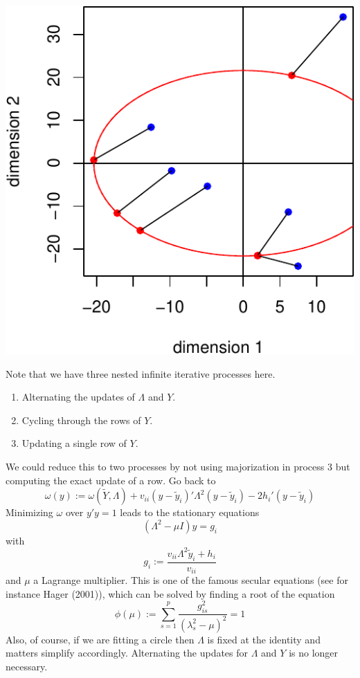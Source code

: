 \documentclass[
  12pt,
]{article}
\providecommand{\tightlist}{%
  \setlength{\itemsep}{0pt}\setlength{\parskip}{0pt}}
\begin{document}
\begin{center}\includegraphics{smacofCS_files/figure-latex/ploplo-1} \end{center}

Note that we have three nested infinite iterative processes here.

\begin{enumerate}
\def\labelenumi{\arabic{enumi}.}
\tightlist
\item
  Alternating the updates of \(\Lambda\) and \(Y\).
\item
  Cycling through the rows of \(Y\).
\item
  Updating a single row of \(Y\).
\end{enumerate}

We could reduce this to two processes by not using majorization in process 3
but computing the exact update of a row. Go back to
\[
\omega(y):=\omega(\tilde Y,\Lambda)+v_{ii}(y-\tilde y_i)'\Lambda^2(y-\tilde y_i)
-2h_i'(y-\tilde y_i)
\]
Minimizing \(\omega\) over \(y'y=1\) leads to the stationary equations
\[
(\Lambda^2-\mu I)y=g_i
\]
with
\[
g_i:=\frac{v_{ii}\Lambda^2\tilde y_i+h_i}{v_{ii}}
\]
and \(\mu\) a Lagrange multiplier. This is one of the famous secular equations (see for instance Hager (2001)), which can be solved by finding a root of the equation
\[
\phi(\mu):=\sum_{s=1}^p\frac{g_{is}^2}{(\lambda_s^2-\mu)^2}=1
\]
Also, of course, if we are fitting a circle then \(\Lambda\) is fixed at the identity and
matters simplify accordingly. Alternating the updates for \(\Lambda\) and \(Y\) is no longer
necessary.
\end{document}
